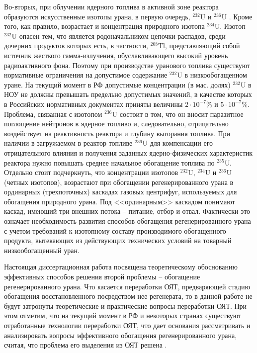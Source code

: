 Во-вторых, при облучении ядерного топлива в активной зоне реактора образуются искусственные изотопы урана, в первую очередь, $^{232}$U и $^{236}$U . Кроме того, как правило, возрастает и концентрация природного изотопа $^{234}$U. Изотоп $^{232}$U опасен тем, что является родоначальником цепочки распадов, среди дочерних продуктов которых есть,  в частности, $^{208}$Tl, представляющий собой источник жесткого гамма-излучения, обуславливающего высокий уровень радиоактивного фона. Поэтому при производстве уранового топлива существуют нормативные ограничения на допустимое содержание $^{232}$U в низкообогащенном уране. На текущий момент в РФ допустимые концентрации (в мас. долях) $^{232}$U в НОУ не должны превышать предельно допустимых значений, в качестве которых в Российских нормативных документах приняты величины $2\cdot10^{-7}$\% и $5\cdot10^{-7}$\%. Проблема, связанная с изотопом $^{236}$U состоит в том, что он вносит паразитное поглощение нейтронов в ядерное топливо и, следовательно, отрицательно воздействует на реактивность реактора и глубину выгорания топлива. При наличии в загружаемом в реактор топливе $^{236}$U для компенсации его отрицательного влияния и получения заданных ядерно-физических характеристик реактора нужно повышать среднее начальное обогащение топлива по $^{235}$U.  Отдельно стоит подчеркнуть, что концентрации изотопов $^{232}$U, $^{234}$U и $^{236}$U (четных изотопов), возрастают при обогащении регенерированного урана в ординарных (трехпоточных) каскадах газовых центрифуг, используемых для обогащения природного урана. Под <<ординарным>> каскадом понимают каскад, имеющий три внешних потока -- питание, отбор и отвал. Фактически это означает необходимость развития способов обогащения регенерированного урана с учетом требований к изотопному составу производимого обогащенного продукта, вытекающих из действующих технических условий на товарный низкообогащенный уран.

Настоящая диссертационная работа посвящена теоретическому обоснованию эффективных способов решения второй проблемы -- обогащение регенерированного урана. Что касается переработки ОЯТ, предваряющей стадию обогащения восстановленного посредством нее регенерата, то в данной работе не будут затронуты теоретические и практические вопросы переработки ОЯТ. При этом отметим, что на текущий момент в РФ и некоторых странах существуют отработанные технологии переработки ОЯТ, что дает основания рассматривать и анализировать вопросы эффективного обогащения регенерированного урана, считая, что проблема его выделения из ОЯТ решена \cite{KoncepciyaPoObrashcheniyu,gaoEconomicPotentialFuel2017,moratillasoriaRecyclingLongTermStorage2013,bouchardECONOMICSNUCLEARENERGY}.

